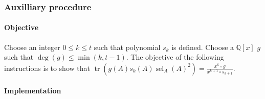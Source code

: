 \documentclass[twocolumn]{article}
\DeclareMathOperator{\tr}{tr}
\DeclareMathOperator{\sel}{sel}
\begin{document}
			\subsubsection*{Auxilliary procedure}\label{sec:procedure 73 auxilliary procedure}
				\paragraph{Objective}
					Choose an integer $0\le k\le t$ such that polynomial $s_k$ is defined. Choose a $\mathbb{Q}[x]$ $g$ such that $\deg(g)\le\min(k,t-1)$. The objective of the following instructions is to show that $\tr(g(A)s_k(A)\sel_A(A)^2)=\frac{x^k\circ g}{x^{k+1}\circ s_{k+1}}$.
				\paragraph{Implementation}
\end{document}
